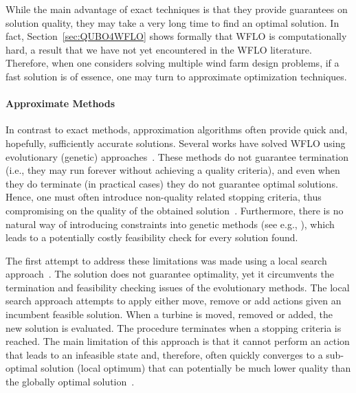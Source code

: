 \documentclass[preprint,12pt]{elsarticle}
\begin{document}
While the main advantage of exact techniques
is that they provide guarantees on solution quality, they may take a very long time to  find an optimal solution. 
In fact, Section~\ref{sec:QUBO4WFLO} shows formally that WFLO is computationally hard, a result
that we have not yet encountered in the WFLO literature. Therefore,
when one considers solving multiple wind farm design problems, if a fast solution is of essence,
one may turn to approximate optimization techniques.

\paragraph{Approximate Methods} In contrast to exact methods, approximation algorithms often provide   
quick and, hopefully, sufficiently accurate solutions. Several works have solved 
WFLO using evolutionary (genetic) approaches~\cite{MOSETTI1994105,gonzalez2010optimization,grady2005placement}. 
These methods do not guarantee termination 
(i.e., they may run forever without achieving a quality criteria), and even when they do terminate (in practical cases) they do
not guarantee optimal solutions. Hence, one must often
introduce non-quality related stopping criteria, 
thus compromising on the quality of the obtained solution~\cite{davis1991handbook}.
Furthermore, there is no natural way of introducing constraints into genetic methods (see e.g., \cite{sorkhabi2018constrained}), which
leads to a potentially costly feasibility check for every solution found. 

The first attempt to address these limitations 
was made using a local search approach~\cite{ozturk2004heuristic}. 
The solution does not guarantee optimality, 
yet it circumvents the termination and feasibility checking issues of the evolutionary
methods. The local search approach attempts to apply either move, remove or add actions given an incumbent 
feasible solution. When a turbine is moved, removed or added, the new solution is evaluated. The procedure terminates 
when a stopping criteria is reached.
The main limitation of this approach 
is that it cannot perform an action 
that leads to an infeasible state and, therefore, often quickly converges to a sub-optimal solution (local optimum) 
that can potentially be much lower quality than the globally optimal solution~\cite{rivas2009solving}. 
\end{document}
